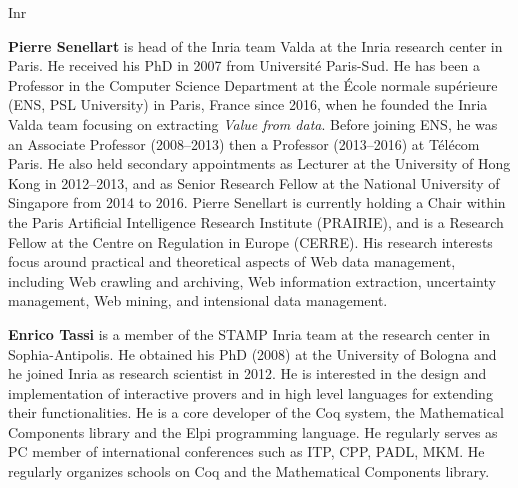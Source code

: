\begin{sitedescription}{Inr}
\begin{compactitem}
\item{\bf Pierre Senellart} is head of the Inria team Valda at the Inria
  research center in Paris. He
  received his PhD in 2007 from Université Paris-Sud. He has been a
    Professor in the Computer Science Department at the École normale
    supérieure (ENS, PSL University) in Paris, France since 2016, when he
    founded the Inria Valda team focusing on extracting \emph{Value from
    data}. Before joining ENS, he was an Associate Professor (2008–2013)
    then a Professor (2013–2016) at Télécom Paris. He also held secondary
    appointments as Lecturer at the University of Hong Kong in 2012–2013,
    and as Senior Research Fellow at the National University of Singapore
    from 2014 to 2016. Pierre Senellart is currently holding a Chair
    within the Paris Artificial Intelligence Research Institute
    (PRAIRIE), and is a Research Fellow at the Centre on Regulation in
    Europe (CERRE).
    His research interests
    focus around practical and theoretical aspects of Web data
    management, including Web crawling and archiving, Web information
    extraction, uncertainty management, Web mining, and intensional data
    management.

\item{\bf Enrico Tassi} is a member of the STAMP Inria team at the research
center in Sophia-Antipolis. He obtained his PhD (2008) at the University of
Bologna and he joined Inria as research scientist in 2012.
He is interested in the design and implementation of interactive
provers and in high level languages for extending their functionalities.
He is a core developer of the Coq system, the Mathematical Components library
and the Elpi programming language. He regularly serves as PC member of
international conferences such as ITP, CPP, PADL, MKM. He regularly organizes
schools on Coq and the Mathematical Components library.



\end{compactitem}
\end{sitedescription}
